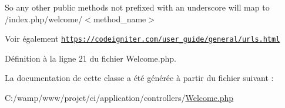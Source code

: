 So any other public methods not prefixed with an underscore will map to /index.php/welcome/$<$method\+\_\+name$>$ \begin{DoxySeeAlso}{Voir également}
\href{https://codeigniter.com/user_guide/general/urls.html}{\tt https\+://codeigniter.\+com/user\+\_\+guide/general/urls.\+html} 
\end{DoxySeeAlso}


Définition à la ligne 21 du fichier Welcome.\+php.



La documentation de cette classe a été générée à partir du fichier suivant \+:\begin{DoxyCompactItemize}
\item 
C\+:/wamp/www/projet/ci/application/controllers/\mbox{\hyperlink{_welcome_8php}{Welcome.\+php}}\end{DoxyCompactItemize}
